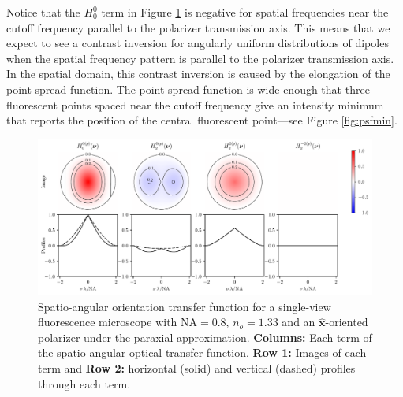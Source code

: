 \documentclass[11pt]{article}
\providecommand{\mh}[1]{\mathbf{\hat{#1}}}
\begin{document}
Notice that the $H_0^0$ term in Figure \ref{fig:otf} is negative for spatial
frequencies near the cutoff frequency parallel to the polarizer transmission
axis. This means that we expect to see a contrast inversion for angularly
uniform distributions of dipoles when the spatial frequency pattern is parallel
to the polarizer transmission axis. In the spatial domain, this contrast
inversion is caused by the elongation of the point spread function. The point
spread function is wide enough that three fluorescent points spaced near the
cutoff frequency give an intensity minimum that reports the position of the
central fluorescent point---see Figure \ref{fig:psfmin}.

\begin{figure}[H]
 \captionsetup{width=1.0\linewidth}
 \centering
   \centering
   \includegraphics[width = 1.\textwidth]{../calculations/otfs0.pdf}
   \caption{Spatio-angular orientation transfer function for a single-view
     fluorescence microscope with $\text{NA}=0.8$, $n_o=1.33$ and an
     $\mh{x}$-oriented polarizer under the paraxial approximation.
     \textbf{Columns:} Each term of the spatio-angular optical transfer
     function. \textbf{Row 1:} Images of each term and \textbf{Row 2:}
     horizontal (solid) and vertical (dashed) profiles through each term.}
   \label{fig:otf}
\end{figure}
\end{document}
